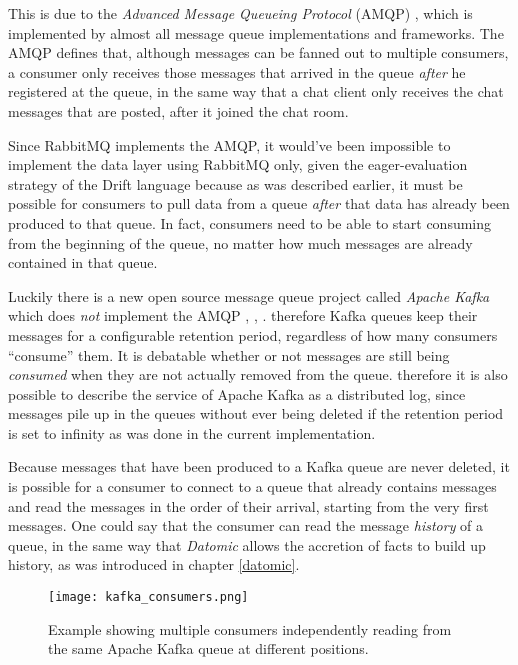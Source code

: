 This is due to the \textit{Advanced Message Queueing Protocol}
(AMQP) \cite{amqp}, \cite{amqp-wiki}
which is implemented by almost all message queue
implementations and frameworks. The AMQP defines that,
although messages can be fanned out to multiple consumers,
a consumer only receives those messages that arrived in the
queue \textit{after} he registered at the queue, in the
same way that a chat client only receives the chat messages
that are posted, after it joined the chat room.

Since RabbitMQ implements the AMQP, it would've been impossible
to implement the data layer using RabbitMQ only, given the
eager-evaluation strategy of the Drift language because as was
described earlier, it must be possible for consumers to pull
data from a queue \textit{after} that data has already been
produced to that queue. In fact, consumers need to be able
to start consuming from the beginning of the queue, no matter
how much messages are already contained in that queue.

Luckily there is a new open source message queue project called
\textit{Apache Kafka} which does \textit{not} implement the AMQP
\cite{kafka}, \cite{kafkapaper}, \cite{kafkabook}.
therefore Kafka queues keep their messages for a configurable
retention period, regardless of how many consumers ``consume''
them. It is debatable whether or not messages are still being
\textit{consumed} when they are not actually removed from the
queue. therefore it is also possible to describe the service of
Apache Kafka as a distributed log, since messages pile up in
the queues without ever being deleted if the retention period
is set to infinity as was done in the current implementation.
\newline

Because messages that have been produced to a Kafka queue are
never deleted, it is possible for a consumer to connect to a queue
that already contains messages and read the messages in the order
of their arrival, starting from the very first messages. One could
say that the consumer can read the message \textit{history} of a
queue, in the same way that \textit{Datomic} allows the accretion
of facts to build up history, as was introduced in chapter \ref{datomic}.

\begin{wrapfigure}{l}{0.5\textwidth}
  \texttt{[image: kafka\_consumers.png]}
  \caption{Example showing multiple consumers independently reading from
           the same Apache Kafka queue at different positions.}
  \label{kafka-consumers}
\end{wrapfigure}

